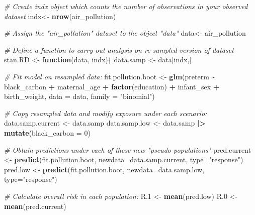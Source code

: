 \documentclass[
]{article}
\newenvironment{Shaded}{\begin{snugshade}}{\end{snugshade}}
\newcommand{\AttributeTok}[1]{\textcolor[rgb]{0.13,0.29,0.53}{#1}}
\newcommand{\CommentTok}[1]{\textcolor[rgb]{0.56,0.35,0.01}{\textit{#1}}}
\newcommand{\ControlFlowTok}[1]{\textcolor[rgb]{0.13,0.29,0.53}{\textbf{#1}}}
\newcommand{\DecValTok}[1]{\textcolor[rgb]{0.00,0.00,0.81}{#1}}
\newcommand{\FloatTok}[1]{\textcolor[rgb]{0.00,0.00,0.81}{#1}}
\newcommand{\FunctionTok}[1]{\textcolor[rgb]{0.13,0.29,0.53}{\textbf{#1}}}
\newcommand{\NormalTok}[1]{#1}
\newcommand{\OtherTok}[1]{\textcolor[rgb]{0.56,0.35,0.01}{#1}}
\newcommand{\SpecialCharTok}[1]{\textcolor[rgb]{0.81,0.36,0.00}{\textbf{#1}}}
\newcommand{\StringTok}[1]{\textcolor[rgb]{0.31,0.60,0.02}{#1}}
\begin{document}
\begin{Shaded}
\begin{Highlighting}[]
\CommentTok{\# Create indx object which counts the number of observations in your observed dataset}
\NormalTok{indx}\OtherTok{\textless{}{-}} \FunctionTok{nrow}\NormalTok{(air\_pollution) }

\CommentTok{\# Assign the "air\_pollution" dataset to the object "data"}
\NormalTok{data}\OtherTok{\textless{}{-}}\NormalTok{ air\_pollution}

\CommentTok{\# Define a function to carry out analysis on re{-}sampled version of dataset}
\NormalTok{stan.RD }\OtherTok{\textless{}{-}} \ControlFlowTok{function}\NormalTok{(data, indx)\{}
\NormalTok{  data.samp }\OtherTok{\textless{}{-}}\NormalTok{ data[indx,]}
  
  \CommentTok{\# Fit model on resampled data:}
\NormalTok{  fit.pollution.boot }\OtherTok{\textless{}{-}} \FunctionTok{glm}\NormalTok{(preterm }\SpecialCharTok{\textasciitilde{}}\NormalTok{ black\_carbon }\SpecialCharTok{+}\NormalTok{ maternal\_age }\SpecialCharTok{+} 
                              \FunctionTok{factor}\NormalTok{(education) }\SpecialCharTok{+}\NormalTok{ infant\_sex }\SpecialCharTok{+}\NormalTok{ birth\_weight,}
                    \AttributeTok{data =}\NormalTok{ data, }\AttributeTok{family =} \StringTok{"binomial"}\NormalTok{)}
  
  \CommentTok{\# Copy resampled data and modify exposure under each scenario:}
\NormalTok{  data.samp.current }\OtherTok{\textless{}{-}}\NormalTok{ data.samp}
\NormalTok{  data.samp.low }\OtherTok{\textless{}{-}}\NormalTok{ data.samp }\SpecialCharTok{|\textgreater{}} \FunctionTok{mutate}\NormalTok{(}\AttributeTok{black\_carbon =} \DecValTok{0}\NormalTok{)}
  
  \CommentTok{\# Obtain predictions under each of these new "pseudo{-}populations"}
\NormalTok{  pred.current }\OtherTok{\textless{}{-}} \FunctionTok{predict}\NormalTok{(fit.pollution.boot, }\AttributeTok{newdata=}\NormalTok{data.samp.current, }\AttributeTok{type=}\StringTok{"response"}\NormalTok{)}
\NormalTok{  pred.low }\OtherTok{\textless{}{-}} \FunctionTok{predict}\NormalTok{(fit.pollution.boot, }\AttributeTok{newdata=}\NormalTok{data.samp.low, }\AttributeTok{type=}\StringTok{"response"}\NormalTok{)}
  
  \CommentTok{\# Calculate overall risk in each population:}
\NormalTok{  R}\FloatTok{.1} \OtherTok{\textless{}{-}} \FunctionTok{mean}\NormalTok{(pred.low)}
\NormalTok{  R}\FloatTok{.0} \OtherTok{\textless{}{-}} \FunctionTok{mean}\NormalTok{(pred.current)}
  

\end{Highlighting}
\end{Shaded}
\end{document}
